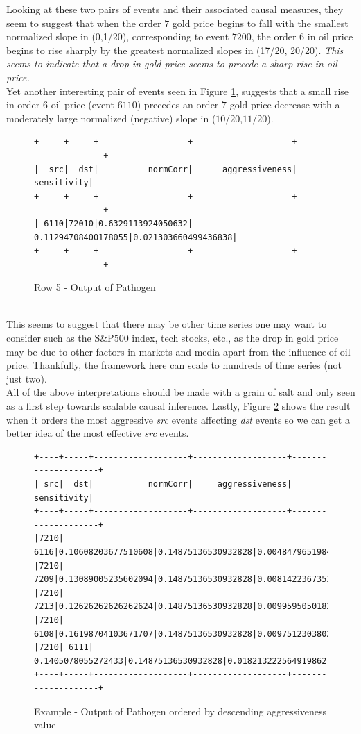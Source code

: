\documentclass[a4, 11pt]{article}
\begin{document}
Looking at these two pairs of events and their associated causal measures, they seem to suggest that when the order $7$ gold price begins to fall with the smallest normalized slope in (0,1/20), corresponding to event $7200$, the order $6$ in oil price begins to rise sharply by the greatest normalized slopes in (17/20, 20/20). \textit{This seems to indicate that a drop in gold price seems to precede a sharp rise in oil price.}\\[2ex]
Yet another interesting pair of events seen in Figure \ref{fig:graph4}, suggests that a small rise in order $6$ oil price (event $6110$) precedes an order $7$ gold price decrease with a moderately large normalized (negative) slope in ($10/20$,$11/20$).
\begin{figure}[!ht]
\centering
    \begin{BVerbatim}[baselinestretch=0.1,fontsize=\fontsize{12}{0}\selectfont]
+-----+-----+------------------+--------------------+--------------------+
|  src|  dst|          normCorr|      aggressiveness|         sensitivity|
+-----+-----+------------------+--------------------+--------------------+
| 6110|72010|0.6329113924050632| 0.11294708400178055|0.021303660499436838|
+-----+-----+------------------+--------------------+--------------------+
    \end{BVerbatim}
    \caption{Row 5 - Output of Pathogen}
    \label{fig:graph4}
\end{figure}
\\This seems to suggest that there may be other time series one may want to consider such as the S$\&$P$500$ index, tech stocks, etc., as the drop in gold price may be due to other factors in markets and media apart from the influence of oil price. Thankfully, the framework here can scale to hundreds of time series (not just two).\\[2ex]
All of the above interpretations should be made with a grain of salt and only seen as a first step towards scalable causal inference. Lastly, Figure \ref{fig:graph5} shows the result when it orders the most aggressive \textit{src} events affecting \textit{dst} events so we can get a better idea of the most effective \textit{src} events.
\begin{figure}[!ht]
\centering
    \begin{BVerbatim}[baselinestretch=0.1,fontsize=\fontsize{12}{0}\selectfont]
+----+-----+-------------------+-------------------+--------------------+
| src|  dst|           normCorr|     aggressiveness|         sensitivity|
+----+-----+-------------------+-------------------+--------------------+
|7210| 6116|0.10608203677510608|0.14875136530932828|0.004847965198487746|
|7210| 7209|0.13089005235602094|0.14875136530932828|0.008142236735386854|
|7210| 7213|0.12626262626262624|0.14875136530932828|0.009959505018202556|
|7210| 6108|0.16198704103671707|0.14875136530932828|0.009751230380228208|
|7210| 6111| 0.1405078055272433|0.14875136530932828|0.018213222564919862|
+----+-----+-------------------+-------------------+--------------------+
    \end{BVerbatim}
    \caption{Example - Output of Pathogen ordered by descending aggressiveness value}
    \label{fig:graph5}
\end{figure}
\end{document}
